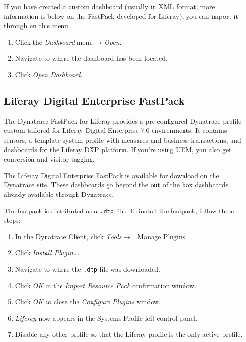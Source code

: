 If you have created a custom dashboard (usually in XML format; more
information is below on the FastPack developed for Liferay), you can
import it through on this menu.

\begin{enumerate}
\def\labelenumi{\arabic{enumi}.}
\item
  Click the \emph{Dashboard} menu → \emph{Open}.
\item
  Navigate to where the dashboard has been located.
\item
  Click \emph{Open Dashboard}.
\end{enumerate}

\subsection{Liferay Digital Enterprise
FastPack}\label{liferay-digital-enterprise-fastpack}

The Dynatrace FastPack for Liferay provides a pre-configured Dynatrace
profile custom-tailored for Liferay Digital Enterprise 7.0 environments.
It contains sensors, a template system profile with measures and
business transactions, and dashboards for the Liferay DXP platform. If
you're using UEM, you also get conversion and visitor tagging.

The Liferay Digital Enterprise FastPack is available for download on the
\href{https://community.dynatrace.com/community/display/DL/Liferay+Digital+Enterprise+FastPack}{Dynatrace
site}. These dashboards go beyond the out of the box dashboards already
available through Dynatrace.

The fastpack is distributed as a \texttt{.dtp} file. To install the
fastpack, follow these steps:

\begin{enumerate}
\def\labelenumi{\arabic{enumi}.}
\item
  In the Dynatrace Client, click \emph{Tools} →\_ Manage Plugins\_.
\item
  Click \emph{Install Plugin\ldots{}}.
\item
  Navigate to where the \texttt{.dtp} file was downloaded.
\item
  Click \emph{OK} in the \emph{Import Resource Pack} confirmation
  window.
\item
  Click \emph{OK} to close the \emph{Configure Plugins} window.
\item
  \emph{Liferay} now appears in the Systems Profile left control panel.
\item
  Disable any other profile so that the Liferay profile is the only
  active profile.
\end{enumerate}

